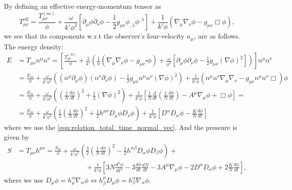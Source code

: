 By defining an effective energy-momentum tensor as
\begin{equation}
    T^{\mathrm{eff}}_{\mu\nu}=\frac{T_{\mu\nu}^{(m)}}{\phi}+\frac{\omega}{k'\phi^2}\left[\partial_\mu \phi \partial_\nu \phi-\frac{1}{2}g_{\mu\nu}\phi_{,\lambda}\phi^{,\lambda}\right]+\frac{1}{k'\phi}\left(\nabla_\mu\nabla_\nu\phi-g_{\mu\nu}\Box\phi\right),
\end{equation}
we see that its components w.r.t the observer's four-velocity $n_\mu$, are as follows. The energy density:
\begin{align}
    E &= T_{\mu\nu}n^\mu n^\nu=\left[\frac{T^{(M)}_{\mu \nu}}{\phi}+\frac{1}{k'}\left(\frac{1}{\phi}\left(\nabla_\mu \nabla_\nu \phi-g_{\mu \nu} \square \phi\right)+\frac{\omega}{\phi^2}\left[\partial_\mu \phi \partial_\nu \phi-\frac{1}{2} g_{\mu \nu}(\nabla \phi)^2\right]\right)\right]n^\mu n^\nu\nonumber\\
    &=\frac{E_m}{\phi}+\frac{\omega}{k'\phi^2}\left((n^\mu\partial_\mu \phi)(n^\nu\partial_\nu\phi)-\frac{1}{2}g_{\mu\nu}n^\mu n^\nu (\nabla \phi)^2\right)+\frac{1}{k'\phi}\left(n^\mu n^\nu \nabla_\mu \nabla_\nu - g_{\mu\nu}n^\mu n^\nu \Box\right)\phi\nonumber\\
    &=\frac{E_m}{\phi}+\frac{\omega}{k'\phi^2}\left(\left(\frac{1}{N}\frac{d\phi}{dt}\right)^2+\frac{1}{2}(\nabla\phi)^2\right)+\frac{1}{k'\phi}\left[\frac{1}{N}\frac{d}{dt}\left(\frac{1}{N}\frac{d\phi}{dt}\right)-A^\mu\nabla_\mu\phi+\Box\phi\right]=\nonumber\\
    &=\frac{E_m}{\phi}+\frac{\omega}{k'\phi^2}\left(\frac{1}{2}\left(\frac{1}{N}\frac{d\phi}{dt}\right)^2+\frac{1}{2}h^{\mu\nu}D_\mu\phi D_\nu\phi\right)+\frac{1}{k'\phi}\left[D^\alpha D_\alpha\phi-\frac{K}{N}\frac{d\phi}{dt}\right]
    \label{eqn:energy_density_jf}
\end{align}
where we use the \cref{eqn:relation_total_time_normal_vec}. And the pressure is given by
\begin{align}
    S&=T_{\mu\nu}h^{\mu\nu}=\frac{S_m}{\phi}+\frac{\omega}{k'\phi^2}\left(\frac{3}{2}\left(\frac{1}{N}\frac{d\phi}{dt}\right)^2 -\frac{1}{2}h^{\alpha\beta} D_\alpha\phi D_\beta\phi\right)+\label{eqn:pressure_jf}\\
    &\qquad\qquad\qquad\qquad\qquad+\frac{1}{k'\phi}\left[3N\frac{d^2\phi}{dt^2}-3\frac{d\phi}{dt}\frac{dN}{dt}-3A^\mu\nabla_\mu\phi -2D^\alpha D_\alpha \phi+2\frac{K}{N}\frac{d\phi}{dt} \right],\nonumber
\end{align}
where we use $D_\mu \phi = h_\mu^\alpha \nabla_\alpha\phi \Leftrightarrow h^\mu_\beta D_\mu \phi = h^\alpha_\beta \nabla_\alpha \phi$.




